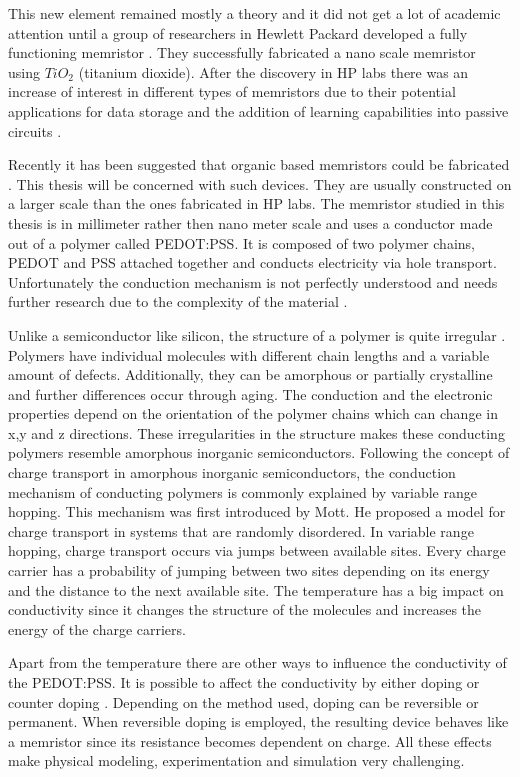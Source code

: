 \begin{doublespace}
This new element remained mostly a theory and it did not get a lot of academic attention until a group of researchers in Hewlett Packard developed a fully functioning memristor \cite{MisMem}. They successfully fabricated a nano scale memristor using $TiO_2$ (titanium dioxide). After the discovery in HP labs there was an increase of interest in different types of memristors due to their potential applications for data storage and the addition of learning capabilities into passive circuits \cite{AdaptiveMem} \cite{Synapse} \cite{CMOS}. 

Recently it has been suggested that organic based memristors could be fabricated \cite{OrganicMem}. This thesis will be concerned with such devices. They are usually constructed on a larger scale than the ones fabricated in HP labs. The memristor studied in this thesis is in millimeter rather then nano meter scale and uses a conductor made out of a polymer called PEDOT:PSS. It is composed of two polymer chains, PEDOT and PSS attached together and conducts electricity via hole transport. Unfortunately the conduction mechanism is not perfectly understood and needs further research due to the complexity of the material \cite{PedotBook}.

Unlike a semiconductor like silicon, the structure of a polymer is quite irregular \cite{PedotBook}. Polymers have individual molecules with different chain lengths and a variable amount of defects. Additionally, they can be amorphous or partially crystalline and further differences occur through aging. The conduction and the electronic properties depend on the orientation of the polymer chains which can change in x,y and z directions. These irregularities in the structure makes these conducting polymers resemble amorphous inorganic semiconductors. Following the concept of charge transport in amorphous inorganic semiconductors, the conduction mechanism of conducting polymers is commonly explained by variable range hopping. This mechanism was first introduced by Mott\cite{Mott}. He proposed a model for charge transport in systems that are randomly disordered. In variable range hopping, charge transport occurs via jumps between available sites. Every charge carrier has a probability of jumping between two sites depending on its energy and the distance to the next available site. The temperature has a big impact on conductivity since it changes the structure of the molecules and increases the energy of the charge carriers.

Apart from the temperature there are other ways to influence the conductivity of the PEDOT:PSS. It is possible to affect the conductivity by either doping or counter doping \cite{PedotDope}. Depending on the method used, doping can be reversible or permanent. When reversible doping is employed, the resulting device behaves like a memristor since its resistance becomes dependent on charge. All these effects make physical modeling, experimentation and simulation very challenging. 


\end{doublespace}
